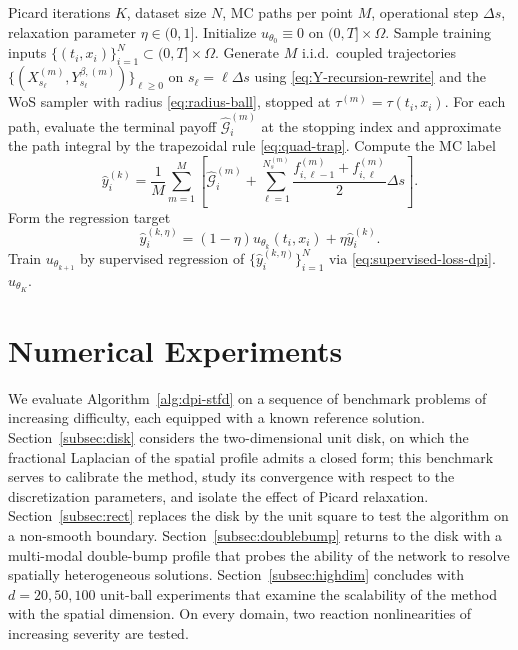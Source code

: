 \documentclass[a4paper,fleqn]{cas-sc}
\begin{document}
\begin{algorithm}[t]
\caption{Deep Picard iteration for nonlinear space-time fractional diffusion PDEs}
\label{alg:dpi-stfd}
\begin{algorithmic}[1]
\Require Picard iterations $K$, dataset size $N$, MC paths per point $M$, operational step $\Delta s$, relaxation parameter $\eta\in(0,1]$.
\State Initialize $u_{\theta_0}\equiv0$ on $(0,T]\times\Omega$.
  \State Sample training inputs $\{(t_i,x_i)\}_{i=1}^N\subset(0,T]\times\Omega$.
    \State Generate $M$ i.i.d.\ coupled trajectories
    $\{(X^{(m)}_{s_\ell},Y^{\beta,(m)}_{s_\ell})\}_{\ell\ge0}$
    on $s_\ell=\ell\Delta s$ using \eqref{eq:Y-recursion-rewrite} and the
    WoS sampler with radius \eqref{eq:radius-ball}, stopped at
    $\tau^{(m)}=\tau(t_i,x_i)$.
    \State For each path, evaluate the terminal payoff
    $\widehat{\mathcal{G}}_i^{(m)}$ at the stopping index and approximate the
    path integral by the trapezoidal rule \eqref{eq:quad-trap}.
    \State Compute the MC label
    \[
    \widehat y_i^{(k)}
    =
    \frac{1}{M}\sum_{m=1}^M
    \left[
    \widehat{\mathcal{G}}_i^{(m)}
    +
    \sum_{\ell=1}^{N_s^{(m)}}
    \frac{
    f_{i,\ell-1}^{(m)}+f_{i,\ell}^{(m)}
    }{2}\Delta s
    \right].
    \]
    \State Form the regression target
    \[
    \widehat{y}_i^{(k,\eta)}
    =
    (1-\eta)u_{\theta_k}(t_i,x_i)+\eta\widehat{y}_i^{(k)}.
    \]
  \EndFor
  \State Train $u_{\theta_{k+1}}$ by supervised regression of
  $\{\widehat{y}_i^{(k,\eta)}\}_{i=1}^N$ via \eqref{eq:supervised-loss-dpi}.
\EndFor
\State \Return $u_{\theta_K}$.
\end{algorithmic}
\end{algorithm}

\section{Numerical Experiments}\label{sec:numexp}

We evaluate Algorithm~\ref{alg:dpi-stfd} on a sequence of benchmark problems
of increasing difficulty, each equipped with a known reference solution.
Section~\ref{subsec:disk} considers the two-dimensional unit disk, on which
the fractional Laplacian of the spatial profile admits a closed form; this
benchmark serves to calibrate the method, study its convergence with respect
to the discretization parameters, and isolate the effect of Picard
relaxation. Section~\ref{subsec:rect} replaces the disk by the unit square
to test the algorithm on a non-smooth boundary. Section~\ref{subsec:doublebump}
returns to the disk with a multi-modal double-bump profile that probes the
ability of the network to resolve spatially heterogeneous solutions.
Section~\ref{subsec:highdim} concludes with $d=20,50,100$ unit-ball
experiments that examine the scalability of the method with the spatial
dimension. On every domain, two reaction nonlinearities of increasing
severity are tested.
\end{document}
